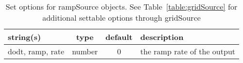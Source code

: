 \begin{table}[ht]
\centering
\begin{tabular}{p{5cm} c c p{7cm}}
\hline
string(s) & type & default & description \\
\hline
dodt, ramp, rate & number & 0 & the ramp rate of the output\\
\hline
\end{tabular}
\caption{Set options for rampSource objects. See Table~\ref{table:gridSource} for additional settable options through gridSource}
\label{table:rampSource}
\end{table}

